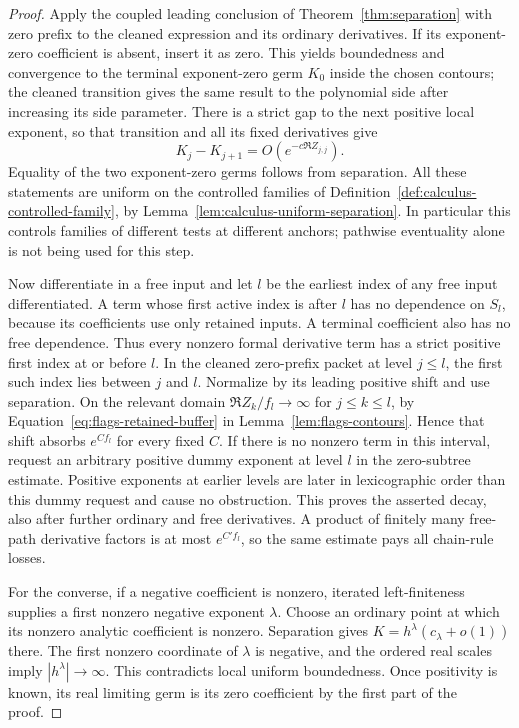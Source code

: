 \begin{proof}
Apply the coupled leading conclusion of Theorem~\ref{thm:separation} with
zero prefix to the cleaned expression and its ordinary derivatives.
If its exponent-zero coefficient is absent, insert it as zero.  This yields
boundedness and convergence to the terminal exponent-zero germ $K_0$
inside the chosen contours; the cleaned transition gives the same result
to the polynomial side after increasing its side parameter.  There is a strict gap to the
next positive local exponent, so that transition and all its fixed
derivatives give
\[
 K_j-K_{j+1}=O(e^{-c\Re Z_{j,j}}).
\]
Equality of the two exponent-zero germs follows from separation.
All these statements are uniform on the controlled families of
Definition~\ref{def:calculus-controlled-family}, by
Lemma~\ref{lem:calculus-uniform-separation}.  In particular this controls
families of different tests at different anchors; pathwise eventuality
alone is not being used for this step.

Now differentiate in a free input and let $l$ be the earliest index of any
free input differentiated.  A term whose first active index is after $l$
has no dependence on $S_l$, because its coefficients use only retained
inputs.  A terminal coefficient also has no free dependence.  Thus every
nonzero formal derivative term has a strict positive first index at or
before $l$.  In the cleaned zero-prefix packet at level $j\le l$, the
first such index lies between $j$ and $l$.  Normalize by its leading
positive shift and use separation.  On the relevant domain
$\Re Z_k/f_l\to\infty$ for $j\le k\le l$, by
Equation~\eqref{eq:flags-retained-buffer} in
Lemma~\ref{lem:flags-contours}.  Hence that shift absorbs
$e^{C f_l}$ for every fixed $C$.  If there is no nonzero term in this
interval, request an arbitrary positive dummy exponent at level $l$ in the
zero-subtree estimate.  Positive exponents at earlier levels are later in
lexicographic order than this dummy request and cause no obstruction.
This proves the asserted decay, also after further ordinary and free
derivatives.  A product of finitely many free-path derivative factors is
at most $e^{C'f_l}$, so the same estimate pays all chain-rule losses.

For the converse, if a negative coefficient is nonzero, iterated
left-finiteness supplies a first nonzero negative exponent $\lambda$.
Choose an ordinary point at which its nonzero analytic coefficient is
nonzero.  Separation gives
$K=h^\lambda(c_\lambda+o(1))$ there.  The first nonzero coordinate of
$\lambda$ is negative, and the ordered real scales imply
$|h^\lambda|\to\infty$.  This contradicts local uniform boundedness.
Once positivity is known, its real limiting germ is its zero coefficient
by the first part of the proof.
\end{proof}

